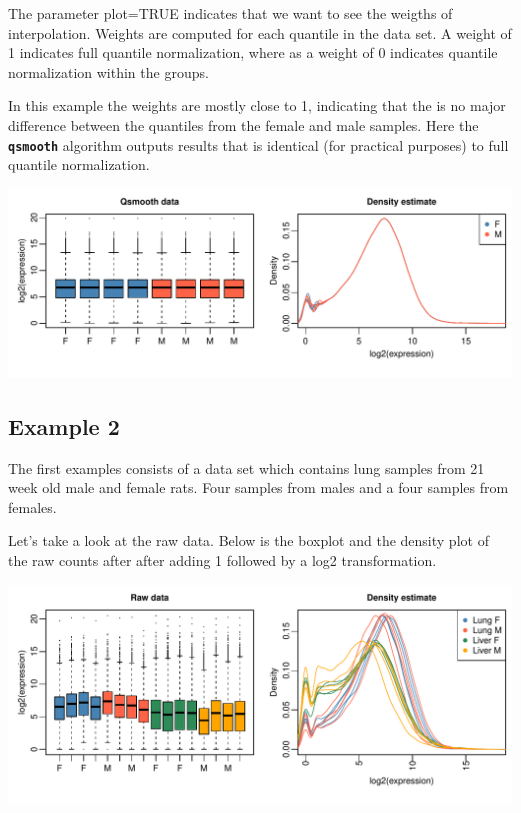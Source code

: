 \documentclass{article}\usepackage[]{graphicx}\usepackage[usenames,dvipsnames]{color}
\makeatletter
\def\maxwidth{ %
  \ifdim\Gin@nat@width>\linewidth
    \linewidth
  \else
    \Gin@nat@width
  \fi
}
\newenvironment{knitrout}{}{} %
\makeatother
\begin{document}
The parameter plot=TRUE indicates that we want to see the 
weigths of interpolation.
Weights are computed for each quantile in the data set.
A weight of 1 indicates full quantile normalization,
where as a weight of 0 indicates quantile normalization
within the groups.

In this example the weights are mostly close to 1,
indicating that the is no major difference between the 
quantiles from the female and male samples.
Here the \texttt{\bf{qsmooth}} algorithm outputs results
that is identical (for practical purposes)
to full quantile normalization. 

\begin{knitrout}
\color{fgcolor}

{\centering \includegraphics[width=\maxwidth]{figure/norm_data1-1} 

}



\end{knitrout}

\subsection{Example 2}
The first examples consists of a data set which contains lung samples 
from 21 week old male and female rats. 
Four samples from males and a four samples from females.



Let's take a look at the raw data. 
Below is the boxplot and the density plot
of the raw counts after after adding 1 followed by a 
log2 transformation.

\begin{knitrout}
\color{fgcolor}

{\centering \includegraphics[width=\maxwidth]{figure/raw12-1} 

}



\end{knitrout}
\end{document}
